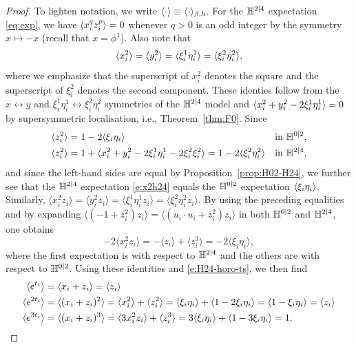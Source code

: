 \documentclass[11pt]{amsart}
\numberwithin{equation}{section}
\numberwithin{theorem}{section}
\newcommand{\ab}[1]{\langle #1 \rangle} %
\begin{document}
\begin{proof}
  To lighten notation, we write $\langle \cdot \rangle \equiv \langle \cdot \rangle_{\beta,h}$.
  For the $\mathbb{H}^{2|4}$ expectation \eqref{eq:exp}, we have
  $\langle x_i^qz_i^p \rangle = 0$ whenever $q>0$ is an odd integer by the symmetry
  $x\mapsto -x$ (recall that $x=\phi^1$). Also note that
  \begin{equation} \label{e:x2h24}
    \langle x_i^2 \rangle = \langle y_i^2 \rangle = \langle \xi_i^1\eta_i^1 \rangle = \langle \xi_i^2\eta_i^2 \rangle,
  \end{equation}
  where we emphasize that the superscript of $x_i^2$ denotes the
  square and the superscript of $\xi_i^2$ denotes the second component.
  These identies follow from the $x\leftrightarrow y$
  and $\xi_{i}^{1}\eta_{i}^{1}\leftrightarrow \xi_{i}^{2}\eta_{i}^{2}$
  symmetries of the $\mathbb{H}^{2|4}$ model and $\langle x_i^2+y_i^2-2\xi_i^1\eta_i^1 \rangle =0$
  by supersymmetric localisation, i.e., Theorem~\ref{thm:F0}.
  Since
  \begin{align}
    \langle z_i^2 \rangle &= 1- 2\langle \xi_i\eta_i \rangle
    && \text{in $\mathbb{H}^{0|2}$},
    \\
    \langle z_i^2 \rangle &= 1+\langle x_i^2+ y_i^2-2\xi_i^1\eta_i^1-2\xi_i^2\xi_i^2 \rangle
                  = 1- 2\langle \xi_i^2\eta_i^2 \rangle
    && \text{in $\mathbb{H}^{2|4}$},
  \end{align}
  and since the left-hand sides are equal by Proposition~\ref{prop:H02-H24}, we further see that
  the $\mathbb{H}^{2|4}$ expectation \eqref{e:x2h24} equals the $\mathbb{H}^{0|2}$ expectation $\langle \xi_i\eta_i \rangle$.
  Similarly, $\ab{x_{i}^{2}z_{i}} = \ab{y_{i}^{2}z_{i}} =
    \ab{\xi_{i}^{1}\eta_{i}^{1}z_{i}}=
    \ab{\xi_{i}^{2}\eta_{i}^{2}z_{i}}$. By using the preceding
    equalities and by expanding 
    $\ab{(-1+z_{i}^{2})z_{i}}=\ab{(u_{i}\cdot u_{i}+z_{i}^{2})z_{i}}$
    in both $\mathbb{H}^{0|2}$ and $\mathbb{H}^{2|4}$, one obtains
   \begin{equation}
     -2\ab{x_{i}^{2}z_{i}} = -\ab{z_{i}} + \ab{z_{i}^{3}} = -2\ab{\xi_{i}\eta_{i}},
 \end{equation}
 where the first expectation is 
 with respect to $\mathbb{H}^{2|4}$ and the others are with respect to $\mathbb{H}^{0|2}$.
Using these identities and \eqref{e:H24-horo-ts}, we then find
  \begin{align}
    \label{e:et-pf}
    \langle e^{t_i} \rangle &= \langle x_i+z_i \rangle = \langle z_i \rangle 
    \\
    \label{e:e2t-pf}
    \langle e^{2t_i} \rangle &= \langle (x_i + z_i)^2 \rangle = \langle x_i^2 \rangle + \langle z_i^2 \rangle = \langle \xi_i\eta_i \rangle + \langle 1 - 2\xi_i\eta_i \rangle = \langle 1-\xi_i\eta_i \rangle = \langle z_i \rangle
    \\
    \label{e:e3t-pf}
    \langle e^{3t_i} \rangle &= \langle (x_i + z_i)^3 \rangle = \langle 3x_i^2z_i \rangle +
                     \langle z_i^3 \rangle = 3\langle \xi_{i}\eta_{i} \rangle
+ \langle 1 - 3\xi_i\eta_i \rangle
                     = 1
                     .
  \end{align}


\end{proof}
\end{document}

